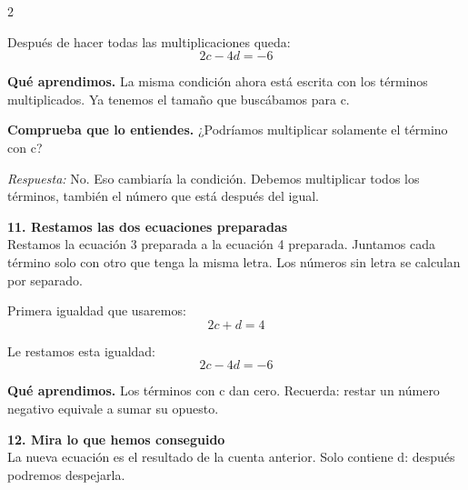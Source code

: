 \documentclass[11pt,a4paper,landscape]{article}
\begin{document}
\begin{multicols*}{2}
\begin{minipage}{\linewidth}
\par\smallskip Después de hacer todas las multiplicaciones queda:
\[2c - 4d = -6\]
\par\smallskip\textbf{Qué aprendimos.} La misma condición ahora está escrita con los términos multiplicados. Ya tenemos el tamaño que buscábamos para c.
\par\smallskip\textbf{Comprueba que lo entiendes.} ¿Podríamos multiplicar solamente el término con c?\par\textit{Respuesta:} No. Eso cambiaría la condición. Debemos multiplicar todos los términos, también el número que está después del igual.
\end{minipage}\par\medskip
\noindent\begin{minipage}{\linewidth}\textbf{11. Restamos las dos ecuaciones preparadas}\\[2pt]Restamos la ecuación 3 preparada a la ecuación 4 preparada. Juntamos cada término solo con otro que tenga la misma letra. Los números sin letra se calculan por separado.
\par{}\par\smallskip
\par\smallskip Primera igualdad que usaremos:
\[2c + d = 4\]
\par\smallskip Le restamos esta igualdad:
\[2c - 4d = -6\]
\par\smallskip\textbf{Qué aprendimos.} Los términos con c dan cero. Recuerda: restar un número negativo equivale a sumar su opuesto.
\end{minipage}\par\medskip
\noindent\begin{minipage}{\linewidth}\textbf{12. Mira lo que hemos conseguido}\\[2pt]La nueva ecuación es el resultado de la cuenta anterior. Solo contiene d: después podremos despejarla.

\end{minipage}
\end{multicols*}
\end{document}
